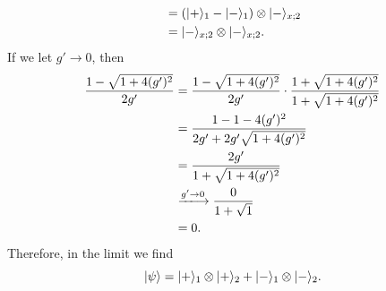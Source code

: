 \documentclass[11pt, letterpaper]{article}
\begin{document}
\begin{enumerate}
\begin{enumerate}
\begin{align*}
					    &=\left( \lvert+\rangle_1 -\lvert-\rangle_1 \right) \otimes \lvert-\rangle_{x;2} \\
					    &=\lvert-\rangle_{x;2} \otimes \lvert-\rangle_{x;2}
			.\end{align*}
			If we let $g'\to 0$, then
			\begin{align*}
				\frac{1-\sqrt{1+4(g')^2} }{2g'} &=\frac{1-\sqrt{1+4(g')^2} }{2g'} \cdot \frac{1+\sqrt{1+4(g')^2} }{1+\sqrt{1+4(g')^2} } \\
								&=\frac{1-1-4(g')^2}{2g'+2g'\sqrt{1+4(g')^2} } \\
								&=\frac{2g'}{1+\sqrt{1+4(g')^2} } \\
								&\xlongrightarrow{g'\to 0}\frac{0}{1+\sqrt{1} } \\
								&=0
			.\end{align*}
			Therefore, in the limit we find
			\[
				\lvert\psi \rangle =\lvert+\rangle_1 \otimes \lvert+\rangle_2 +\lvert-\rangle_1 \otimes \lvert-\rangle_2
			.\]
	\end{enumerate}
\end{enumerate}
\end{document}
